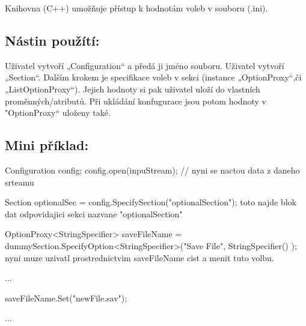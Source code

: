 Knihovna (C++) umožňuje přístup k hodnotám voleb v souboru (.ini).

\subsection*{Nástin použítí\+:}

Uživatel vytvoří „\+Configuration“ a předá ji jméno souboru. Uživatel vytvoří „\+Section“. Dalším krokem je specifikace voleb v sekci (instance „\+Option\+Proxy“,či „\+List\+Option\+Proxy“). Jejich hodnoty si pak uživatel uloží do vlastních proměnných/atributů. Při ukládání konfugurace jsou potom hodnoty v "Option\+Proxy“ uloženy také.

\subsection*{Mini příklad\+:}



 
\begin{DoxyPre}{\ttfamily 
Configuration config; 
config.open(inpuStream); // nyni se nactou data z daneho srteamu}\end{DoxyPre}



\begin{DoxyPre}{\ttfamily Section optionalSec = config.SpecifySection("optionalSection"); 
toto najde blok dat odpovidajici sekci nazvane "optionalSection"}\end{DoxyPre}



\begin{DoxyPre}{\ttfamily OptionProxy<StringSpecifier> saveFileName =  
            dummySection.SpecifyOption<StringSpecifier>("Save File", StringSpecifier() );
nyni muze uzivatl prostrednictvim saveFileName cist a menit tuto volbu.}\end{DoxyPre}



\begin{DoxyPre}{\ttfamily ...}\end{DoxyPre}



\begin{DoxyPre}{\ttfamily saveFileName.Set("newFile.sav");}\end{DoxyPre}



\begin{DoxyPre}{\ttfamily ...}\end{DoxyPre}



